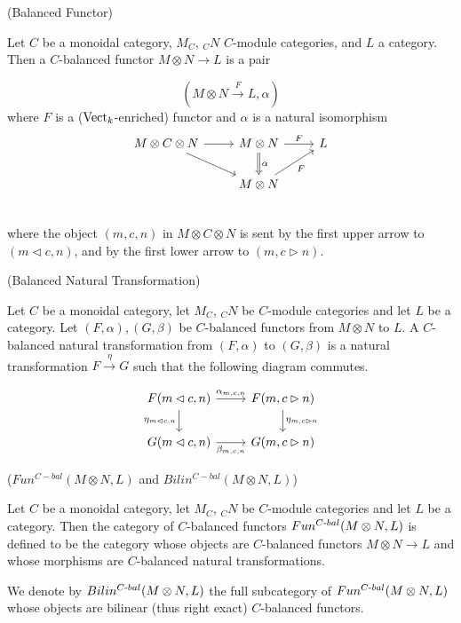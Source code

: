 \begin{definition} (Balanced Functor)

  \noindent Let $C$ be a monoidal category, $M_{C}$, $_{C}N$ $C$-module
  categories, and $L$ a category. \quad Then a $C$-balanced functor $M \otimes
  N\to L$ is a pair

  \[(M \otimes N \xrightarrow{F} L, \alpha)\]
  where $F$ is a ($\operatorname{Vect}_k$-enriched) functor and $\alpha$ is a natural isomorphism
  \[
    \begin{tikzcd}
      M \otimes C \otimes N \arrow[r] \arrow[dr] &
      M \otimes N \arrow[d, Rightarrow, "\alpha"] \arrow[r, "F"] &
      L \\
      & M \otimes N \arrow[ur, "F"'] \\
    \end{tikzcd}
  \]
  where the object $(m,c,n)$ in $M \otimes C \otimes N$ is sent by the first
  upper arrow to $(m \lhd c, n)$, and by the first lower arrow to $(m, c \rhd n)$.
\end{definition}

\begin{definition} (Balanced Natural Transformation)

  \noindent Let $C$ be a monoidal category, let $M_{C}$, $_{C}N$ be $C$-module
  categories and let $L$ be a category. Let $(F,\alpha), (G,\beta)$ be
  $C$-balanced functors from $M \otimes N$ to $L$. A $C$-balanced natural
  transformation from $(F,\alpha)$ to $(G,\beta)$ is a natural transformation
  $ F \xrightarrow{\eta} G$ such that the following diagram commutes.

  \[
    \begin{tikzcd}
      F(m \lhd c, n) \arrow[r, "\alpha_{m,c,n}"] \arrow[d, "\eta_{m \lhd c, n}"'] &
      F(m, c \rhd n) \arrow[d, "\eta_{m, c \rhd n}"] \\
      G(m \lhd c, n) \arrow[r, "\beta_{m,c,n}"'] &
      G(m, c \rhd n)
    \end{tikzcd}
  \]
\end{definition}

\begin{definition} ($Fun^{C-bal}(M \otimes N, L)$ and $Bilin^{C-bal}(M \otimes N, L)$)

  \noindent Let $C$ be a monoidal category, let $M_{C}$, $_{C}N$ be $C$-module
  categories and let $L$ be a category. \quad Then the category of
  $C$-balanced functors $Fun^{C{\text -}bal}(M \otimes N, L)$ is defined to be
  the category whose objects are $C$-balanced functors $M \otimes N \to L$ and
  whose morphisms are $C$-balanced natural transformations.

  We denote by $Bilin^{C{\text -}bal}(M \otimes N, L)$ the full subcategory of
  $Fun^{C{\text -}bal}(M \otimes N, L)$ whose objects are bilinear (thus right
  exact) $C$-balanced functors.
\end{definition}

